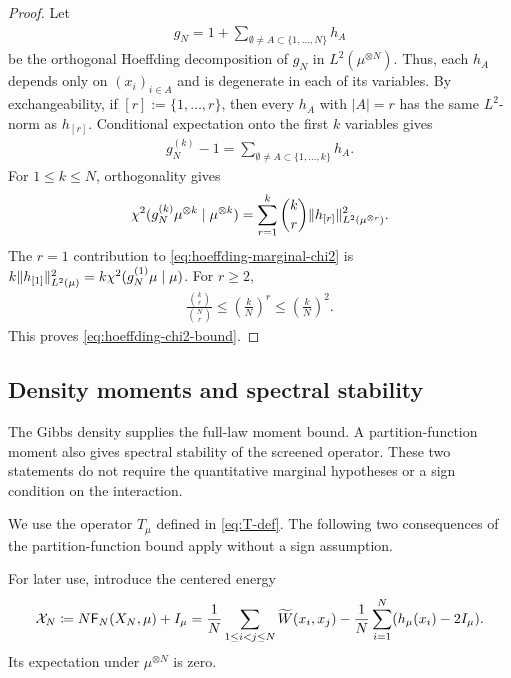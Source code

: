 \documentclass[11pt,reqno]{amsart}
\numberwithin{equation}{section}
\theoremstyle{plain}
\theoremstyle{remark}
\DeclarePairedDelimiter{\pa}{\lparen}{\rparen}
\DeclarePairedDelimiter{\norm}{\lVert}{\rVert}
\newcommand{\tl}{\widetilde}
\newcommand{\Fr}{{\mathsf{F}}}
\newcommand{\XN}{X_N}
\newcommand{\Chi}{\chi^2}
\begin{document}
\begin{proof}
Let
\begin{align}\label{eq:hoeffding-decomposition-general}
 g_N=1+\sum_{\emptyset\ne A\subset\{1,\ldots,N\}}h_A
\end{align}
be the orthogonal Hoeffding decomposition of \(g_N\) in \(L^2(\mu^{\otimes N})\).  Thus, each \(h_A\) depends only on \((x_i)_{i\in A}\) and is degenerate in each of its variables.  By exchangeability, if \([r]:=\{1,\ldots,r\}\), then every \(h_A\) with \(|A|=r\) has the same \(L^2\)-norm as \(h_{[r]}\).  Conditional expectation onto the first \(k\) variables gives
\begin{align}\label{eq:hoeffding-marginal-decomposition}
 g_N^{(k)}-1=\sum_{\emptyset\ne A\subset\{1,\ldots,k\}}h_A.
\end{align}
For \(1\le k\le N\), orthogonality gives
\begin{align}\label{eq:hoeffding-marginal-chi2}
 \Chi(g_N^{(k)}\mu^{\otimes k}\mid\mu^{\otimes k})
 =\sum_{r=1}^k \binom{k}{r}\norm{h_{[r]}}_{L^2(\mu^{\otimes r})}^2.
\end{align}
The \(r=1\) contribution to \eqref{eq:hoeffding-marginal-chi2} is \(k\norm{h_{[1]}}_{L^2(\mu)}^2=k\Chi(g_N^{(1)}\mu\mid\mu)\).  For \(r\ge2\),
\begin{align}\label{eq:hoeffding-combinatorial-ratio}
 \frac{\binom{k}{r}}{\binom{N}{r}}
 \le \left(\frac{k}{N}\right)^r
 \le \left(\frac{k}{N}\right)^2.
\end{align}
This proves \eqref{eq:hoeffding-chi2-bound}.
\end{proof}

\subsection{Density moments and spectral stability}
\label{subsec:density-moments-spectral-stability}

The Gibbs density supplies the full-law moment bound.  A partition-function moment also gives spectral stability of the screened operator.  These two statements do not require the quantitative marginal hypotheses or a sign condition on the interaction.

We use the operator $T_\mu$ defined in \eqref{eq:T-def}.  The following two consequences of the partition-function bound apply without a sign assumption.

For later use, introduce the centered energy
\begin{align}\label{eq:spectral-centered-energy}
\mathcal X_N\coloneqq N\Fr_N(\XN,\mu)+I_\mu
=\frac1N\sum_{1\le i<j\le N}\tl W(x_i,x_j)
-\frac1N\sum_{i=1}^N\pa{h_\mu(x_i)-2I_\mu}.
\end{align}
Its expectation under $\mu^{\otimes N}$ is zero.
\end{document}
